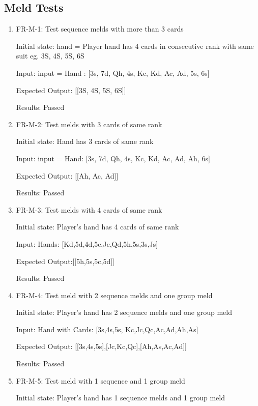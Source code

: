 \documentclass[12pt, titlepage]{article}
\begin{document}
\subsection{Meld Tests}
\begin{enumerate}
    \item FR-M-1: Test sequence melds with more than 3 cards
    
    Initial state: hand = Player hand has 4 cards in consecutive rank with same suit eg. 3S, 4S, 5S, 6S
    
    Input: input = Hand : [3s, 7d, Qh, 4s, Kc, Kd, Ac, Ad, 5s, 6s]
    
    Expected Output: [[3S, 4S, 5S, 6S]]
    
    Results: Passed
    
    \item FR-M-2: Test melds with 3 cards of same rank
    
    Initial state: Hand has  3 cards of same rank
    
    Input: input = Hand: [3s, 7d, Qh, 4s, Kc, Kd, Ac, Ad, Ah, 6s]
    
    Expected Output: [[Ah, Ac, Ad]]
    
    Results: Passed
    
    \item FR-M-3: Test melds with 4 cards of same rank
    
    Initial state: Player's hand has 4 cards of same rank
    
    Input: Hands: [Kd,5d,4d,5c,Jc,Qd,5h,5s,3s,Js]
    
    Expected Output:[[5h,5s,5c,5d]]
    
    Results: Passed
    
    \item FR-M-4: Test meld with 2 sequence melds and one group meld
    
    
    Initial state: Player's hand has 2 sequence melds and one group meld
    
    Input: Hand with Cards: [3s,4s,5s, Kc,Jc,Qc,Ac,Ad,Ah,As]
    
    Expected Output: [[3s,4s,5s],[Jc,Kc,Qc],[Ah,As,Ac,Ad]]
    
    Results: Passed
    
   \item FR-M-5: Test meld with 1 sequence and 1 group meld
    
    Initial state: Player's hand has 1 sequence melds and 1 group meld
    

\end{enumerate}
\end{document}
